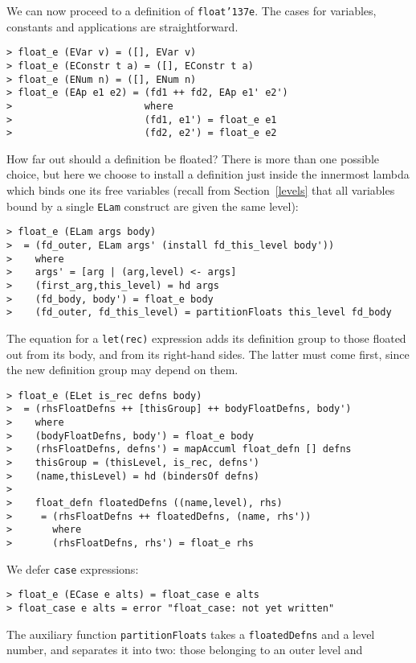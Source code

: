 We can now proceed to a definition of \mbox{\tt float{\char'137}e}.  The cases for
variables, constants and applications are straightforward.
\begin{verbatim}
> float_e (EVar v) = ([], EVar v)
> float_e (EConstr t a) = ([], EConstr t a)
> float_e (ENum n) = ([], ENum n)
> float_e (EAp e1 e2) = (fd1 ++ fd2, EAp e1' e2')
>                       where
>                       (fd1, e1') = float_e e1
>                       (fd2, e2') = float_e e2
\end{verbatim}
How far out should a definition be floated?  There is more than
one possible choice, but here we choose to install a definition
just inside the innermost lambda which binds one its
free variables (recall from
Section~\ref{levels} that all variables bound by a single \mbox{\tt ELam}
construct are given the same level):
\begin{verbatim}
> float_e (ELam args body)
>  = (fd_outer, ELam args' (install fd_this_level body'))
>    where
>    args' = [arg | (arg,level) <- args]
>    (first_arg,this_level) = hd args
>    (fd_body, body') = float_e body
>    (fd_outer, fd_this_level) = partitionFloats this_level fd_body
\end{verbatim}
\par
The equation for a \mbox{\tt let(rec)} expression adds its definition group
to those floated out from its body, and from its right-hand sides.
The latter must come first, since the new definition group may depend on them.
\begin{verbatim}
> float_e (ELet is_rec defns body)
>  = (rhsFloatDefns ++ [thisGroup] ++ bodyFloatDefns, body')
>    where
>    (bodyFloatDefns, body') = float_e body
>    (rhsFloatDefns, defns') = mapAccuml float_defn [] defns
>    thisGroup = (thisLevel, is_rec, defns')
>    (name,thisLevel) = hd (bindersOf defns)
>
>    float_defn floatedDefns ((name,level), rhs)
>     = (rhsFloatDefns ++ floatedDefns, (name, rhs'))
>       where
>       (rhsFloatDefns, rhs') = float_e rhs
\end{verbatim}
We defer \mbox{\tt case} expressions:
\begin{verbatim}
> float_e (ECase e alts) = float_case e alts
> float_case e alts = error "float_case: not yet written"
\end{verbatim}
\par
The auxiliary function \mbox{\tt partitionFloats} takes a \mbox{\tt floatedDefns} and a level
number, and separates it into two: those belonging to an outer level and
